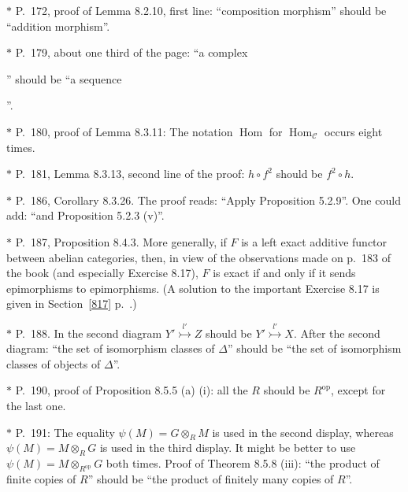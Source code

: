 \documentclass[12pt]{article}
\theoremstyle{remark}
\theoremstyle{definition}
\newcommand{\C}{\mathcal C}
\DeclareMathOperator{\Hom}{Hom}%
\DeclareMathOperator{\op}{op}
\begin{document}

\noindent $*$ P.~172, proof of Lemma 8.2.10, first line: ``composition morphism'' should be ``addition morphism''.


\noindent $*$ P.~179, about one third of the page: ``a complex 
'' 
should be ``a sequence 
''.

\noindent $*$ P.~180, proof of Lemma 8.3.11: The notation $\Hom$ for $\Hom_\C$ occurs eight times.

\noindent $*$ P.~181, Lemma 8.3.13, second line of the proof: $h\circ f^2$ should be $f^2\circ h$.

\noindent $*$ P.~186, Corollary 8.3.26. The proof reads: ``Apply Proposition 5.2.9''. One could add: ``and Proposition 5.2.3 (v)''.

\noindent $*$ P.~187, Proposition 8.4.3. More generally, if $F$ is a left exact additive functor between abelian categories, then, in view of the observations made on p.~183 of the book (and especially Exercise 8.17), $F$ is exact if and only if it sends epimorphisms to epimorphisms. (A solution to the important Exercise 8.17 is given in Section~\ref{817} p.~\pageref{817}.)

\noindent $*$ P.~188. In the second diagram $Y'\overset{l'}{\rightarrowtail}Z$ should be $Y'\overset{l'}{\rightarrowtail}X$. After the second diagram: ``the set of isomorphism classes of $\Delta$'' should be ``the set of isomorphism classes of objects of $\Delta$''.

\noindent $*$ P.~190, proof of Proposition 8.5.5 (a) (i): all the $R$ should be $R^{\op}$, except for the last one.

\noindent $*$ P.~191: The equality $\psi(M)=G\otimes_RM$ is used in the second display, whereas $\psi(M)=M\otimes_RG$ is used in the third display. It might be better to use $\psi(M)=M\otimes_{R^{\op}}G$ both times. Proof of Theorem 8.5.8 (iii): ``the product of finite copies of $R$'' should be ``the product of finitely many copies of $R$''.
\end{document}
